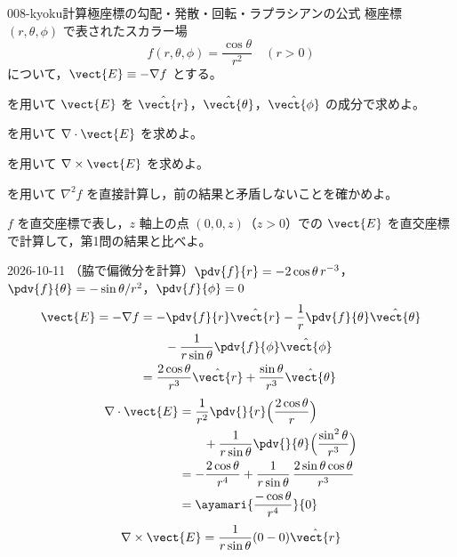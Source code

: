 \documentclass[uplatex,dvipdfmx,a4paper,11pt]{jsarticle}
\begin{document}
\begin{mondai}{008-kyoku}{計算}{極座標の勾配・発散・回転・ラプラシアンの公式}
極座標 $(r,\theta,\phi)$ で表されたスカラー場
  \[ f(r,\theta,\phi) = \frac{\cos\theta}{r^2} \quad (r > 0) \]
  について，$\vect{E} \equiv -\nabla f$ とする。
  \begin{shoumon}
    \item {} を用いて $\vect{E}$ を $\hat{\vect{r}}$，$\hat{\vect{\theta}}$，$\hat{\vect{\phi}}$ の成分で求めよ。
    \item {} を用いて $\nabla\cdot\vect{E}$ を求めよ。
    \item {} を用いて $\nabla\times\vect{E}$ を求めよ。
    \item {} を用いて $\nabla^2 f$ を直接計算し，前の結果と矛盾しないことを確かめよ。
    \item $f$ を直交座標で表し，$z$ 軸上の点 $(0,0,z)$（$z > 0$）での $\vect{E}$ を直交座標で計算して，第1問の結果と比べよ。
  \end{shoumon}
\begin{kotaeutsushi}{2026-10-11}
（脇で偏微分を計算）$\pdv{f}{r}=-2\cos\theta\,r^{-3}$，$\pdv{f}{\theta}=-\sin\theta/r^{2}$，$\pdv{f}{\phi}=0$
\begin{align*}
\vect{E}=-\nabla f&=-\pdv{f}{r}\hat{\vect{r}}-\frac{1}{r}\pdv{f}{\theta}\hat{\vect{\theta}}\\
&\qquad-\frac{1}{r\sin\theta}\pdv{f}{\phi}\hat{\vect{\phi}}\\
&=\frac{2\cos\theta}{r^{3}}\hat{\vect{r}}+\frac{\sin\theta}{r^{3}}\hat{\vect{\theta}}
\end{align*}
\begin{align*}
\nabla\cdot\vect{E}&=\frac{1}{r^{2}}\pdv{}{r}\Bigl(\frac{2\cos\theta}{r}\Bigr)\\
&\qquad+\frac{1}{r\sin\theta}\pdv{}{\theta}\Bigl(\frac{\sin^{2}\theta}{r^{3}}\Bigr)\\
&=-\frac{2\cos\theta}{r^{4}}+\frac{1}{r\sin\theta}\,\frac{2\sin\theta\cos\theta}{r^{3}}\\
&=\ayamari{\frac{-\cos\theta}{r^{4}}}{0}
\end{align*}
\begin{align*}
\nabla\times\vect{E}&=\frac{1}{r\sin\theta}(0-0)\hat{\vect{r}}\\

\end{align*}
\end{kotaeutsushi}
\end{mondai}
\end{document}

